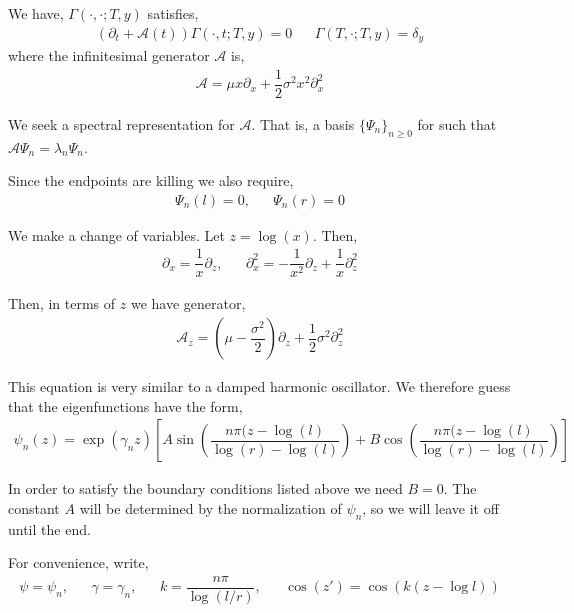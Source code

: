 \documentclass[10pt]{article}
\begin{document}
\begin{solution}[Solution]
We have, \( \Gamma(\cdot, \cdot; T,y) \) satisfies,
\begin{align*}
    (\partial_t + \mathcal{A}(t)) \Gamma(\cdot, t; T,y) = 0 && \Gamma(T, \cdot ;T,y) = \delta_y
\end{align*}
where the infinitesimal generator \( \mathcal{A} \) is,
\begin{align*}
    \mathcal{A}  = \mu x \partial_x + \dfrac{1}{2}\sigma^2 x^2 \partial_x^2
\end{align*}

We seek a spectral representation for \( \mathcal{A} \). That is, a basis \( \{\Psi_n\}_{n\geq 0} \) for such that \( \mathcal{A} \Psi_n  = \lambda_n \Psi_n \).

Since the endpoints are killing we also require,
\begin{align*}
    \Psi_n(l) = 0, && \Psi_n(r) = 0
\end{align*}

We make a change of variables. Let \( z = \log(x) \). Then,
\begin{align*}
    \partial_x = \dfrac{1}{x}\partial_z, && \partial_x^2 = -\dfrac{1}{x^2}\partial_z + \dfrac{1}{x}\partial_z^2 
\end{align*}


Then, in terms of \( z \) we have generator,
\begin{align*}
    \mathcal{A}_z = \left( \mu - \dfrac{\sigma^2}{2} \right) \partial_z + \dfrac{1}{2} \sigma^2 \partial_z^2
\end{align*}


This equation is very similar to a damped harmonic oscillator. We therefore guess that the eigenfunctions have the form,
\begin{align*}
    \psi_n(z) = \exp(\gamma_n z) \left[ A \sin \left( \dfrac{n\pi (z-\log(l)}{\log(r)-\log(l)} \right) + B \cos \left( \dfrac{n\pi (z-\log(l)}{\log(r)-\log(l)} \right) \right]
\end{align*}

In order to satisfy the boundary conditions listed above we need \( B = 0 \). The constant \( A \) will be determined by the normalization of \( \psi_n \), so we will leave it off until the end.

For convenience, write,
\begin{align*}
    \psi = \psi_n, && \gamma = \gamma_n, && k = \dfrac{n\pi}{\log(l/r)}, && \cos(z') = \cos(k(z-\log l))
\end{align*}


\end{solution}
\end{document}
